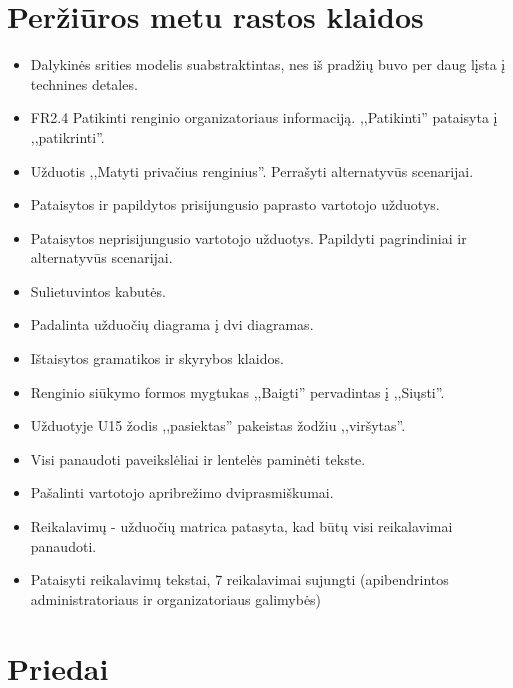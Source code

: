 \documentclass{VUMIFPSkursinis}
\begin{document}
    \section{Peržiūros metu rastos klaidos}
		\begin{itemize}
			\item Dalykinės srities modelis suabstraktintas, nes iš pradžių buvo per daug lįsta į technines detales.
			\item FR2.4 Patikinti renginio organizatoriaus informaciją. ,,Patikinti'' pataisyta į ,,patikrinti''.
			\item Užduotis ,,Matyti privačius renginius''. Perrašyti alternatyvūs scenarijai.
			\item Pataisytos ir papildytos prisijungusio paprasto vartotojo užduotys.
			\item Pataisytos neprisijungusio vartotojo užduotys. Papildyti pagrindiniai ir alternatyvūs scenarijai.
			\item Sulietuvintos kabutės.
			\item Padalinta užduočių diagrama į dvi diagramas.
			\item Ištaisytos gramatikos ir skyrybos klaidos.
			\item Renginio siūkymo formos mygtukas ,,Baigti'' pervadintas į ,,Siųsti''.
			\item Užduotyje U15 žodis ,,pasiektas'' pakeistas žodžiu ,,viršytas''.
			\item Visi panaudoti paveikslėliai ir lentelės paminėti tekste.
			\item Pašalinti vartotojo apribrežimo dviprasmiškumai.
			\item Reikalavimų - užduočių matrica patasyta, kad būtų visi reikalavimai panaudoti.
			\item Pataisyti reikalavimų tekstai, 7 reikalavimai sujungti (apibendrintos administratoriaus ir organizatoriaus galimybės)
		\end{itemize}
		
    \section{Priedai}\label{priedai}
\end{document}
